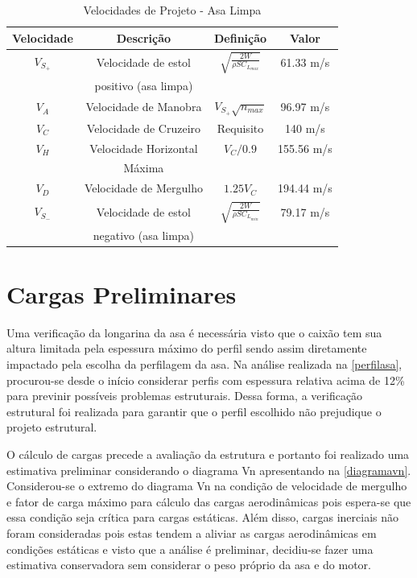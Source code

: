\begin{table}[H]
\centering
\begin{tabular}{cccc}
\toprule
Velocidade & Descrição & Definição & Valor \\ \midrule
$V_{S_{+}}$ & Velocidade de estol & $ \sqrt{\frac{2 W}{\rho S C_{L_{max}}}} $ & 61.33 m/s \\ [0.3cm]
 & positivo (asa limpa) & &  \\ [0.3cm]
$V_A$ & Velocidade de Manobra & $ V_{S_{+}} \sqrt{n_{max}} $ & 96.97 m/s \\ [0.3cm]
$V_C$ & Velocidade de Cruzeiro & Requisito & 140 m/s \\  [0.3cm]
$V_H$ & Velocidade Horizontal & $V_C/0.9$ & 155.56 m/s \\  [0.3cm]
 & Máxima & &  \\ [0.3cm]
$V_D$ & Velocidade de Mergulho & $1.25 V_C$ & 194.44 m/s \\ [0.3cm]
$V_{S_{-}}$ & Velocidade de estol & $ \sqrt{\frac{2 W}{\rho S C_{L_{min}}}} $ & 79.17 m/s \\ [0.3cm]
 & negativo (asa limpa) & &  \\ [0.3cm]
\bottomrule
\end{tabular}
\caption[Velocidades de Projeto - Asa Limpa]{Velocidades de Projeto - Asa Limpa}
\label{tbl:velocidadesprojeto}
\end{table}

\clearpage

\section{Cargas Preliminares}

Uma verificação da longarina da asa é necessária visto que o caixão tem sua altura limitada pela espessura máximo do perfil sendo assim diretamente impactado pela escolha da perfilagem da asa.
Na análise realizada na \autoref{perfilasa}, procurou-se desde o início considerar perfis com espessura relativa acima de 12\% para previnir possíveis problemas estruturais.
Dessa forma, a verificação estrutural foi realizada para garantir que o perfil escolhido não prejudique o projeto estrutural.

O cálculo de cargas precede a avaliação da estrutura e portanto foi realizado uma estimativa preliminar considerando o diagrama Vn apresentando na \autoref{diagramavn}.
Considerou-se o extremo do diagrama Vn na condição de velocidade de mergulho e fator de carga máximo para cálculo das cargas aerodinâmicas pois espera-se que essa condição seja crítica para cargas estáticas.
Além disso, cargas inerciais não foram consideradas pois estas tendem a aliviar as cargas aerodinâmicas em condições estáticas e visto que a análise é preliminar, decidiu-se fazer uma estimativa conservadora sem considerar o peso próprio da asa e do motor.

